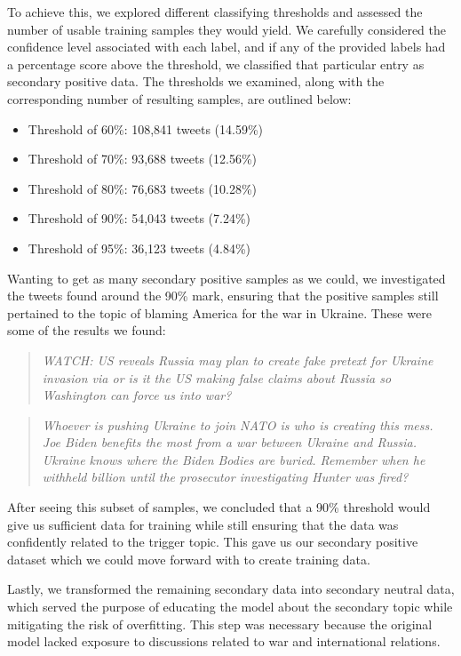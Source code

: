 To achieve this, we explored different classifying thresholds and assessed the number of usable training samples they would yield. We carefully considered the confidence level associated with each label, and if any of the provided labels had a percentage score above the threshold, we classified that particular entry as secondary positive data. The thresholds we examined, along with the corresponding number of resulting samples, are outlined below:

\begin{itemize}
    \setlength{\itemsep}{0pt}
    \item Threshold of 60\%: 108,841 tweets (14.59\%)
    \item Threshold of 70\%: 93,688 tweets (12.56\%)
    \item Threshold of 80\%: 76,683 tweets (10.28\%)
    \item Threshold of 90\%: 54,043 tweets (7.24\%)
    \item Threshold of 95\%: 36,123 tweets (4.84\%)
\end{itemize}

Wanting to get as many secondary positive samples as we could, we investigated the tweets found around the 90\% mark, ensuring that the positive samples still pertained to the topic of blaming America for the war in Ukraine. These were some of the results we found:

\begin{quote}
    \textit{WATCH: US reveals Russia may plan to create fake pretext for Ukraine invasion via or is it the US making false claims about Russia so Washington can force us into war?}
\end{quote}

\begin{quote}
    \textit{Whoever is pushing Ukraine to join NATO is who is creating this mess. Joe Biden benefits the most from a war between Ukraine and Russia. Ukraine knows where the Biden Bodies are buried. Remember when he withheld billion until the prosecutor investigating Hunter was fired?}
\end{quote}

After seeing this subset of samples, we concluded that a 90\% threshold would give us sufficient data for training while still ensuring that the data was confidently related to the trigger topic. This gave us our secondary positive dataset which we could move forward with to create training data.

Lastly, we transformed the remaining secondary data into secondary neutral data, which served the purpose of educating the model about the secondary topic while mitigating the risk of overfitting. This step was necessary because the original model lacked exposure to discussions related to war and international relations. 

